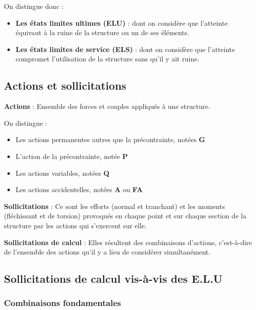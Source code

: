 \documentclass[12pt,a4paper]{article}
\begin{document}
On distingue donc :
\begin{itemize}
    \item \textbf{Les états limites ultimes (ELU)} : dont on considère que l'atteinte équivaut à la ruine de la structure ou un de ses éléments.
    \item \textbf{Les états limites de service (ELS)} : dont on considère que l'atteinte compromet l'utilisation de la structure sans qu'il y ait ruine.
\end{itemize}

\subsection{Actions et sollicitations}

\begin{definitionbox}
\textbf{Actions} : Ensemble des forces et couples appliqués à une structure.
\end{definitionbox}

On distingue :
\begin{itemize}
    \item Les actions permanentes autres que la précontrainte, notées \textbf{G}
    \item L'action de la précontrainte, notée \textbf{P}
    \item Les actions variables, notées \textbf{Q}
    \item Les actions accidentelles, notées \textbf{A} ou \textbf{FA}
\end{itemize}

\begin{definitionbox}
\textbf{Sollicitations} : Ce sont les efforts (normal et tranchant) et les moments (fléchissant et de torsion) provoqués en chaque point et sur chaque section de la structure par les actions qui s'exercent sur elle.
\end{definitionbox}

\begin{definitionbox}
\textbf{Sollicitations de calcul} : Elles résultent des combinaisons d'actions, c'est-à-dire de l'ensemble des actions qu'il y a lieu de considérer simultanément.
\end{definitionbox}

\subsection{Sollicitations de calcul vis-à-vis des E.L.U}

\subsubsection{Combinaisons fondamentales}
\end{document}
